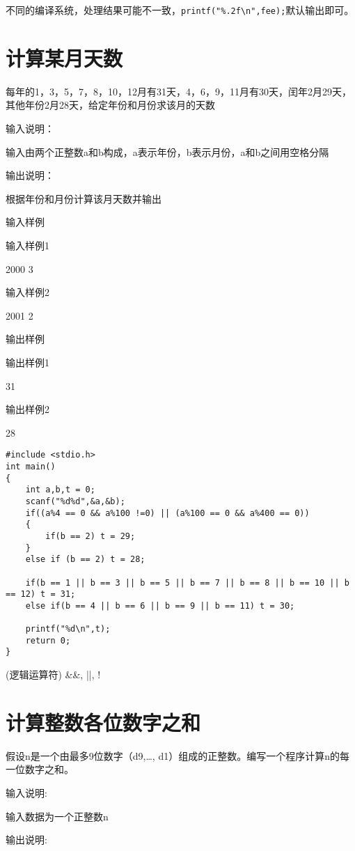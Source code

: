\begin{note}[四舍五入问题]
	不同的编译系统，处理结果可能不一致，\lstinline|printf("%.2f\n",fee);|默认输出即可。
\end{note}

\section{计算某月天数}
每年的1，3，5，7，8，10，12月有31天，4，6，9，11月有30天，闰年2月29天，其他年份2月28天，给定年份和月份求该月的天数

输入说明：

输入由两个正整数a和b构成，a表示年份，b表示月份，a和b之间用空格分隔

输出说明：

根据年份和月份计算该月天数并输出

输入样例	

输入样例1

2000 3

输入样例2

2001 2

输出样例
	
输出样例1

31

输出样例2

28

\begin{lstlisting}
#include <stdio.h>
int main()
{
	int a,b,t = 0;
	scanf("%d%d",&a,&b);
	if((a%4 == 0 && a%100 !=0) || (a%100 == 0 && a%400 == 0))
	{
		if(b == 2) t = 29;
	}
	else if (b == 2) t = 28;
	
	if(b == 1 || b == 3 || b == 5 || b == 7 || b == 8 || b == 10 || b == 12) t = 31;
	else if(b == 4 || b == 6 || b == 9 || b == 11) t = 30; 
	
	printf("%d\n",t);
	return 0;	
}
\end{lstlisting}

\begin{note}(逻辑运算符)
	\&\&, ||, !
\end{note}

\section{计算整数各位数字之和}
假设n是一个由最多9位数字（d9,\dots, d1）组成的正整数。编写一个程序计算n的每一位数字之和。

输入说明:
	
输入数据为一个正整数n

输出说明:
	
